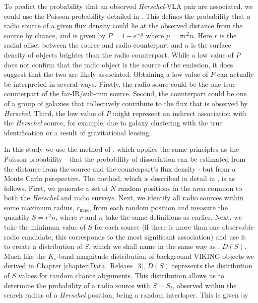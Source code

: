 To predict the probability that an observed \textit{Herschel}-VLA pair are associated, we could use the Poisson probability detailed in \citealt{Downes_1986}. This defines the probability that a radio source of a given flux density could lie at the observed distance from the source by chance, and is given by $P = 1-e^{-\mu}$ where $\mu = \pi r^2n$. Here $r$ is the radial offset between the source and radio counterpart and $n$ is the surface density of objects brighter than the radio counterpart. While a low value of $P$ does not confirm that the radio object is the source of the emission, it does suggest that the two are likely associated. Obtaining a low value of $P$ can actually be interpreted in several ways. Firstly, the radio soure could be the one true counterpart of the far-IR/sub-mm source. Second, the counterpart could be one of a group of galaxies that collectively contribute to the flux that is observed by \textit{Herschel}. Third, the low value of $P$ might represent an indirect association with the \textit{Herschel} source, for example, due to galaxy clustering with the true identification or a result of gravitational lensing.

In this study we use the method of \citealt{Lilly_1999}, which applies the same principles as the Poisson probability - that the probability of dissociation can be estimated from the distance from the source and the counterpart's flux density - but from a Monte Carlo perspective. The method, which is described in detail in \citealt{Dye_2009}, is as follows. First, we generate a set of $N$ random positions in the area common to both the \textit{Herschel} and radio surveys. Next, we identify all radio sources within some maximum radius, $r_{\textrm{max}}$, from each random position and measure the quantity $S = r^2n$, where $r$ and $n$ take the same definitions as earlier. Next, we take the minimum value of $S$ for each source (if there is more than one observable radio candidate, this corresponds to the most significant association) and use it to create a distribution of $S$, which we shall name in the same way as \citealt{Dye_2009}, $D(S)$. Much like the $K_s$-band magnitude distribution of background VIKING objects we derived in Chapter \ref{chapter:Data_Release_3}, $D(S)$ represents the distribution of $S$ values for random chance alignments. This distribution allows us to determine the probability of a radio source with $S = S_i$, observed within the search radius of a \textit{Herschel} position, being a random interloper. This is given by

